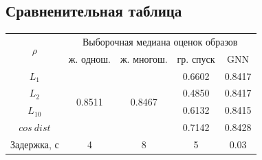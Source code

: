\documentclass[a4paper,14pt]{extarticle}
\begin{document}
				\subsection{Сравненительная таблица}
				\begin{center}
						\begin{tabular}{|c|cccc|}
							\hline
							\multirow{2}{*}{$\rho$} & \multicolumn{4}{c|}{Выборочная медиана оценок образов}                                                                       \\ \cline{2-5} 
							& \multicolumn{1}{c|}{ж. однош.}            & \multicolumn{1}{c|}{ж. многош.}           & \multicolumn{1}{c|}{гр. спуск} & GNN \\ \hline
							$L_1$                   & \multicolumn{1}{c|}{\multirow{4}{*}{0.8511}} & \multicolumn{1}{c|}{\multirow{4}{*}{0.8467}} & \multicolumn{1}{c|}{0.6602}         & 0.8417    \\ \cline{1-1} \cline{4-5} 
							$L_2$                   & \multicolumn{1}{c|}{}                     & \multicolumn{1}{c|}{}                     & \multicolumn{1}{c|}{0.4850}         & 0.8417  \\ \cline{1-1} \cline{4-5} 
							$L_{10}$                & \multicolumn{1}{c|}{}                     & \multicolumn{1}{c|}{}                     & \multicolumn{1}{c|}{0.6132}         &  0.8415  \\ \cline{1-1}\cline{4-5} 
							$cos~dist$              & \multicolumn{1}{c|}{}                     & \multicolumn{1}{c|}{}                     & \multicolumn{1}{c|}{0.7142}         &  0.8428  \\ \hline
							Задержка, с             & \multicolumn{1}{c|}{4}                     & \multicolumn{1}{c|}{8}                     & \multicolumn{1}{c|}{5}          &   0.03  \\ \hline
						\end{tabular}
				\end{center}
			\newpage
			
			
\end{document}
